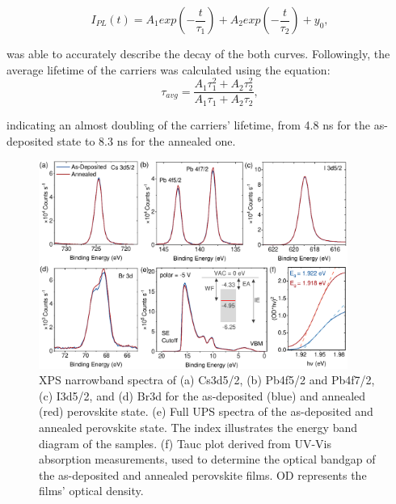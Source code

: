 \begin{equation}
    I_{PL}(t) = A_1exp(-\frac{t}{\tau_1}) + A_2exp(-\frac{t}{\tau_2}) + y_0,
\end{equation}

was able to accurately describe the decay of the both curves. Followingly, the average lifetime of the carriers was calculated using the equation: 
\begin{equation}
    \tau_{avg} = \frac{A_1 \tau_1^2 + A_2 \tau_2^2}{A_1 \tau_1 + A_2 \tau_2},
\end{equation}

indicating an almost doubling of the carriers' lifetime, from 4.8 ns for the as-deposited state to 8.3 ns for the annealed one.

\begin{figure}
  \centering
  \medskip
  \includegraphics[width=0.9\textwidth]{chapters/ellipsometry/image/UPS_XPS_Eg.pdf}
  \caption[XPS and UPS signals of the as-deposited and annealed perovskite state.]{XPS narrowband spectra of (a) Cs3d5/2, (b) Pb4f5/2 and Pb4f7/2, (c) I3d5/2, and (d) Br3d for the as-deposited (blue) and annealed (red) perovskite state. (e) Full UPS spectra of the as-deposited and annealed perovskite state. The index illustrates the energy band diagram of the samples. (f) Tauc plot derived from UV-Vis absorption measurements, used to determine the optical bandgap of the as-deposited and annealed perovskite films. OD represents the films’ optical density.} 
  
  \label{fig:ch3:ups_xps}
\end{figure}

